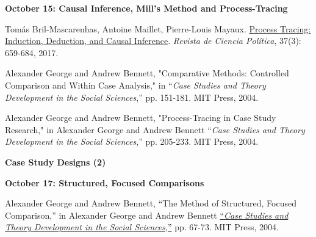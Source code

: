 \documentclass[letterpaper]{article}
\renewenvironment{itemize}{
  \begin{list}{}{
    \setlength{\leftmargin}{1.5em}
  }
}{
  \end{list}
}
\begin{document}
\begin{enumerate}
		\begin{itemize}
		\item {\bf October 15: Causal Inference, Mill's Method and Process-Tracing}
			\begin{itemize}
				\item[$\bullet$]  Tom\'as Bril-Mascarenhas, Antoine Maillet, Pierre-Louis Mayaux. \href{http://www.revistacienciapolitica.cl/index.php/rcp/article/view/354/73}{Process Tracing: Induction, Deduction, and Causal Inference}. \emph{Revista de Ciencia Pol\'itica}, 37(3): 659-684, 2017.
				\item[$\bullet$] Alexander George and Andrew Bennett, "Comparative Methods: Controlled Comparison and Within Case Analysis," in ``\emph{Case Studies and Theory Development in the Social Sciences},'' pp. 151-181. MIT Press, 2004.
				\item[$\bullet$] Alexander George and Andrew Bennett, "Process-Tracing in Case Study Research," in Alexander George and Andrew Bennett ``\emph{Case Studies and Theory Development in the Social Sciences},'' pp. 205-233. MIT Press, 2004.  
			\end{itemize}
		\end{itemize}


\item {\bf Case Study Designs (2)}
		
		\begin{itemize}
		\item {\bf October 17: Structured, Focused Comparisons}
			\begin{itemize}
				\item[$\bullet$] Alexander George and Andrew Bennett, ``The Method of Structured, Focused Comparison,'' in Alexander George and Andrew Bennett \href{https://www.alnap.org/system/files/content/resource/files/main/george-and-bennett-how-to-do-case-studies.pdf}{``\emph{Case Studies and Theory Development in the Social Sciences},''} pp. 67-73. MIT Press, 2004. 
			\end{itemize}
		\end{itemize}



\end{enumerate}
\end{document}
